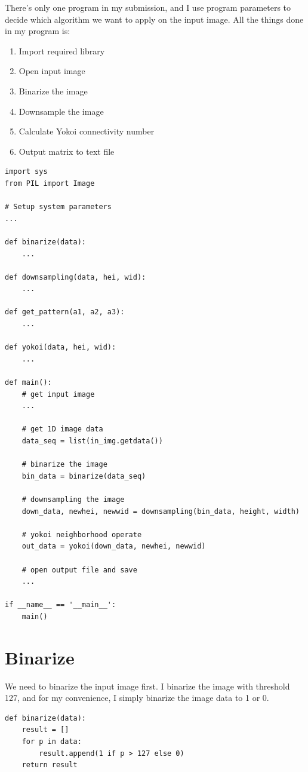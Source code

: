 \documentclass[14pt,a4paper]{extarticle}
\begin{document}
There's only one program in my submission, and I use program parameters to decide which algorithm we want to apply on the input image. All the things done in my program is:
\begin{enumerate}
	\item Import required library
	\item Open input image
	\item Binarize the image
	\item Downsample the image
	\item Calculate Yokoi connectivity number
	\item Output matrix to text file
\end{enumerate}

\begin{lstlisting}
import sys
from PIL import Image

# Setup system parameters
...

def binarize(data):
	...

def downsampling(data, hei, wid):
	...

def get_pattern(a1, a2, a3):
	...

def yokoi(data, hei, wid):
	...

def main():
	# get input image
	...

	# get 1D image data
	data_seq = list(in_img.getdata())

	# binarize the image
	bin_data = binarize(data_seq)

	# downsampling the image
	down_data, newhei, newwid = downsampling(bin_data, height, width)

	# yokoi neighborhood operate
	out_data = yokoi(down_data, newhei, newwid)

	# open output file and save
	...

if __name__ == '__main__':
    main()
\end{lstlisting}

\section*{Binarize}

We need to binarize the input image first. I binarize the image with threshold 127, and for my convenience, I simply binarize the image data to 1 or 0.
\begin{lstlisting}
def binarize(data):
	result = []
	for p in data:
		result.append(1 if p > 127 else 0)
	return result
\end{lstlisting}
\end{document}
